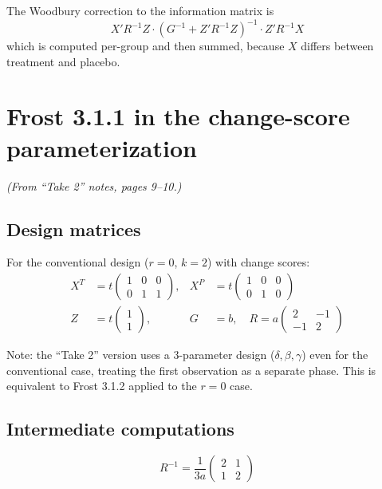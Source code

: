 \documentclass[11pt]{article}
\begin{document}
The Woodbury correction to the information matrix is
\begin{equation}
  X'R^{-1}Z \cdot (G^{-1} + Z'R^{-1}Z)^{-1}
    \cdot Z'R^{-1}X
\end{equation}
which is computed per-group and then summed, because
$X$ differs between treatment and placebo.


\section{Frost 3.1.1 in the change-score parameterization}
\label{sec:frost311}

\noindent
\textit{(From ``Take 2'' notes, pages 9--10.)}

\subsection{Design matrices}

For the conventional design ($r = 0$, $k = 2$) with change
scores:
\begin{align}
  X^{T} &= t\begin{pmatrix}
    1 & 0 & 0 \\ 0 & 1 & 1
  \end{pmatrix}, &
  X^{P} &= t\begin{pmatrix}
    1 & 0 & 0 \\ 0 & 1 & 0
  \end{pmatrix} \\[4pt]
  Z &= t\begin{pmatrix} 1 \\ 1 \end{pmatrix}, &
  G &= b, \quad
  R = a\begin{pmatrix} 2 & -1 \\ -1 & 2 \end{pmatrix}
\end{align}

Note: the ``Take 2'' version uses a 3-parameter design
($\delta, \beta, \gamma$) even for the conventional case,
treating the first observation as a separate phase. This
is equivalent to Frost 3.1.2 applied to the $r=0$ case.

\subsection{Intermediate computations}

\begin{equation}
  R^{-1} = \frac{1}{3a}\begin{pmatrix}
    2 & 1 \\ 1 & 2
  \end{pmatrix}
\end{equation}
\end{document}
